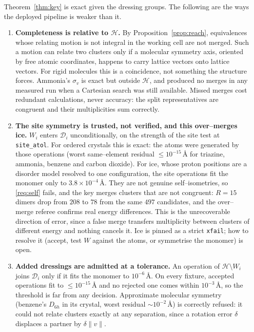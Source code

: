 \documentclass[11pt]{article}
\theoremstyle{definition}
\newcommand{\Hgrp}{\mathcal{H}}
\newcommand{\Dgrp}{\mathcal{D}}
\begin{document}
Theorem~\ref{thm:key} is exact given the dressing groups. The following are the
ways the deployed pipeline is weaker than it.

\begin{enumerate}[leftmargin=2em,label=\textbf{C\arabic*.}]

\item\label{cav:reach}\textbf{Completeness is relative to $\Hgrp$.} By
Proposition~\ref{prop:reach}, equivalences whose relating motion is not integral
in the working cell are not merged. Such a motion can relate two clusters only if
a molecular symmetry axis, oriented by free atomic coordinates, happens to carry
lattice vectors onto lattice vectors. For rigid molecules this is a coincidence,
not something the structure forces. Ammonia's $\sigma_v$ is exact but outside
$\Hgrp$, and produced no merges in any measured run when a Cartesian search was
still available. Missed merges cost redundant calculations, never accuracy: the
split representatives are congruent and their multiplicities sum correctly.

\item\label{cav:W}\textbf{The site symmetry is trusted, not verified, and this
over--merges ice.} $W_i$ enters $\Dgrp_i$ unconditionally, on the strength of the
site test at \texttt{site\_atol}. For ordered crystals this is exact: the atoms
were generated by those operations (worst same--element residual $\le10^{-15}$\,\AA{}
for triazine, ammonia, benzene and carbon dioxide). For ice, whose proton positions
are a disorder model resolved to one configuration, the site operations fit the
monomer only to $3.8\times10^{-4}$\,\AA. They are not genuine self--isometries, so
\ref{req:self} fails, and the key merges clusters that are not congruent: $R=15$
dimers drop from $208$ to $78$ from the same $497$ candidates, and the over--merge
referee confirms real energy differences. This is the unrecoverable direction of
error, since a false merge transfers multiplicity between clusters of different
energy and nothing cancels it. Ice is pinned as a strict \texttt{xfail}; how to
resolve it (accept, test $W$ against the atoms, or symmetrise the monomer) is
open.

\item\label{cav:tol}\textbf{Added dressings are admitted at a tolerance.} An
operation of $\Hgrp\setminus W_i$ joins $\Dgrp_i$ only if it fits the monomer to
$10^{-6}$\,\AA. On every fixture, accepted operations fit to $\le10^{-15}$\,\AA{}
and no rejected one comes within $10^{-3}$\,\AA, so the threshold is far from any
decision. Approximate molecular symmetry (benzene's $D_{6h}$ in its crystal,
worst residual $\sim10^{-2}$\,\AA) is correctly refused: it could not relate
clusters exactly at any separation, since a rotation error $\delta$ displaces a
partner by $\delta\lVert v\rVert$.


\end{enumerate}
\end{document}
